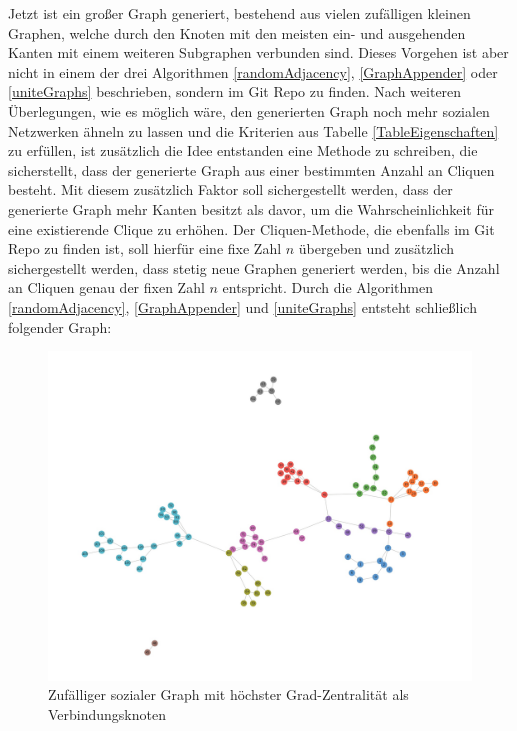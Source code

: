 \newpage
Jetzt ist ein großer Graph generiert, bestehend aus vielen zufälligen kleinen Graphen, welche durch den Knoten mit den meisten ein- und ausgehenden Kanten mit einem weiteren Subgraphen verbunden sind. Dieses Vorgehen ist aber nicht in einem der drei Algorithmen \ref{randomAdjacency}, \ref{GraphAppender} oder \ref{uniteGraphs} beschrieben, sondern im Git Repo \cite{TZ} zu finden. 
Nach weiteren Überlegungen, wie es möglich wäre, den generierten Graph noch mehr sozialen Netzwerken ähneln zu lassen und die Kriterien aus Tabelle \ref{TableEigenschaften} zu erfüllen, ist zusätzlich die Idee entstanden eine Methode zu schreiben, die sicherstellt, dass der generierte Graph aus einer bestimmten Anzahl an Cliquen besteht. Mit diesem zusätzlich Faktor soll sichergestellt werden, dass der generierte Graph mehr Kanten besitzt als davor, um die Wahrscheinlichkeit für eine existierende Clique zu erhöhen. Der Cliquen-Methode, die ebenfalls im Git Repo \cite{TZ} zu finden ist, soll hierfür eine fixe Zahl $n$ übergeben und zusätzlich sichergestellt werden, dass stetig neue Graphen generiert werden, bis die Anzahl an Cliquen genau der fixen Zahl $n$ entspricht.
Durch die Algorithmen \ref{randomAdjacency}, \ref{GraphAppender} und \ref{uniteGraphs} entsteht schließlich folgender Graph:

\FloatBarrier
\begin{figure}[h!]
    \centering
    \hspace*{-1.5cm}
    \includegraphics[width=1.0\textwidth]{Graphics/NearSocialNetwork.jpg}
    \caption{Zufälliger sozialer Graph mit höchster Grad-Zentralität als Verbindungsknoten }
    \label{NearSozialerGraph}
\end{figure}


